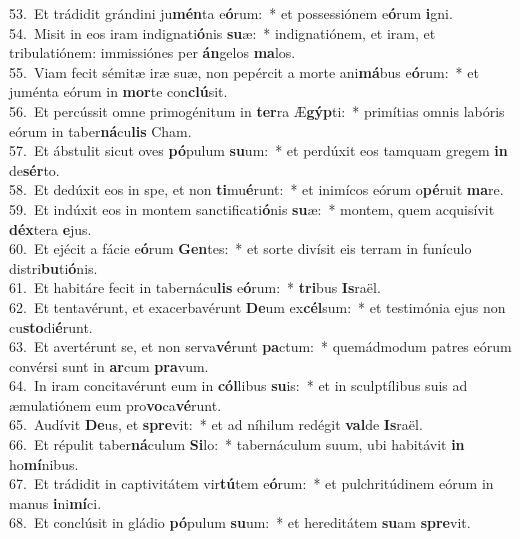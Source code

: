 {53.~}Et trádidit grándini ju\textbf{mén}ta e\textbf{ó}rum:~* et possessiónem e\textbf{ó}rum \textbf{i}gni.\\
{54.~}Misit in eos iram indignati\textbf{ó}nis \textbf{su}æ:~* indignatiónem, et iram, et tribulatiónem: immissiónes per \textbf{án}gelos \textbf{ma}los.\\
{55.~}Viam fecit sémitæ iræ suæ, non pepércit a morte ani\textbf{má}bus e\textbf{ó}rum:~* et juménta eórum in \textbf{mor}te con\textbf{clú}sit.\\
{56.~}Et percússit omne primogénitum in \textbf{ter}ra Æ\textbf{gýp}ti:~* primítias omnis labóris eórum in taber\textbf{ná}cu\textbf{lis} Cham.\\
{57.~}Et ábstulit sicut oves \textbf{pó}pulum \textbf{su}um:~* et perdúxit eos tamquam gregem \textbf{in} de\textbf{sér}to.\\
{58.~}Et dedúxit eos in spe, et non \textbf{ti}mu\textbf{é}runt:~* et inimícos eórum o\textbf{pé}ruit \textbf{ma}re.\\
{59.~}Et indúxit eos in montem sanctificati\textbf{ó}nis \textbf{su}æ:~* montem, quem acquisívit \textbf{déx}tera \textbf{e}jus.\\
{60.~}Et ejécit a fácie e\textbf{ó}rum \textbf{Gen}tes:~* et sorte divísit eis terram in funículo distri\textbf{bu}ti\textbf{ó}nis.\\
{61.~}Et habitáre fecit in tabernácu\textbf{lis} e\textbf{ó}rum:~* \textbf{tri}bus \textbf{Is}raël.\\
{62.~}Et tentavérunt, et exacerbavérunt \textbf{De}um ex\textbf{cél}sum:~* et testimónia ejus non cu\textbf{sto}di\textbf{é}runt.\\
{63.~}Et avertérunt se, et non serva\textbf{vé}runt \textbf{pa}ctum:~* quemádmodum patres eórum convérsi sunt in \textbf{ar}cum \textbf{pra}vum.\\
{64.~}In iram concitavérunt eum in \textbf{cól}libus \textbf{su}is:~* et in sculptílibus suis ad æmulatiónem eum pro\textbf{vo}ca\textbf{vé}runt.\\
{65.~}Audívit \textbf{De}us, et \textbf{spre}vit:~* et ad níhilum redégit \textbf{val}de \textbf{Is}raël.\\
{66.~}Et répulit taber\textbf{ná}culum \textbf{Si}lo:~* tabernáculum suum, ubi habitávit \textbf{in} ho\textbf{mí}nibus.\\
{67.~}Et trádidit in captivitátem vir\textbf{tú}tem e\textbf{ó}rum:~* et pulchritúdinem eórum in manus \textbf{i}ni\textbf{mí}ci.\\
{68.~}Et conclúsit in gládio \textbf{pó}pulum \textbf{su}um:~* et hereditátem \textbf{su}am \textbf{spre}vit.\\

